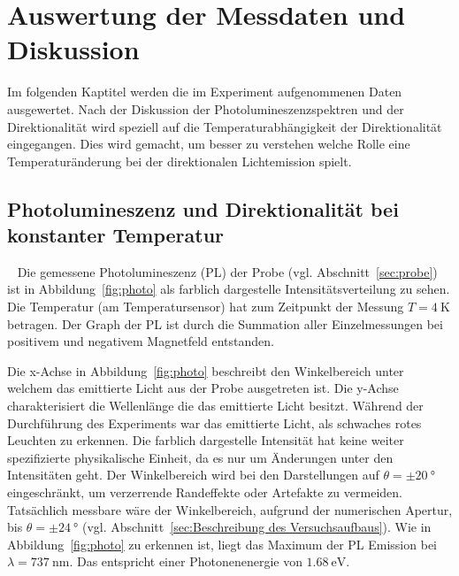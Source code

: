 \chapter{Auswertung der Messdaten und Diskussion}
Im folgenden Kaptitel werden die im Experiment aufgenommenen Daten ausgewertet. 
Nach der Diskussion der Photolumineszenzspektren und der 
Direktionalität wird speziell auf die Temperaturabhängigkeit der 
Direktionalität eingegangen.
Dies wird gemacht, um besser zu verstehen welche Rolle eine Temperaturänderung 
bei der direktionalen Lichtemission spielt.

\section{Photolumineszenz und Direktionalität bei konstanter Temperatur}~\label{sec:PL_u_Direktionalitaet}
Die gemessene Photolumineszenz (PL) der Probe (vgl. Abschnitt~\ref{sec:probe})
ist in Abbildung~\ref{fig:photo} als farblich dargestelle Intensitätsverteilung zu sehen. 
Die Temperatur (am Temperatursensor) hat zum Zeitpunkt der Messung $T = \SI{4}{\kelvin}$ betragen.
Der Graph der PL ist durch die Summation aller Einzelmessungen 
bei positivem und negativem Magnetfeld entstanden. 

Die x-Achse in Abbildung~\ref{fig:photo} beschreibt den Winkelbereich unter welchem das 
emittierte Licht aus der Probe ausgetreten ist.
Die y-Achse charakterisiert die Wellenlänge die das emittierte Licht besitzt. 
Während der Durchführung des Experiments war das emittierte Licht, als schwaches rotes Leuchten zu 
erkennen.
Die farblich dargestelle Intensität hat keine weiter spezifizierte physikalische Einheit, 
da es nur um Änderungen unter den Intensitäten geht.
Der Winkelbereich wird bei den Darstellungen auf $\theta = \pm \SI{20}{\degree}$ 
eingeschränkt, um verzerrende Randeffekte oder Artefakte zu vermeiden. 
Tatsächlich messbare wäre der Winkelbereich, aufgrund der numerischen Apertur, 
bis $\theta = \pm \SI{24}{\degree}$ 
(vgl. Abschnitt~\ref{sec:Beschreibung des Versuchsaufbaus}).
Wie in Abbildung~\ref{fig:photo} zu erkennen ist, 
liegt das Maximum der PL Emission bei $\lambda = \SI{737}{\nano\meter}$.
Das entspricht einer Photonenenergie von $\SI{1,68}{\eV}$.

